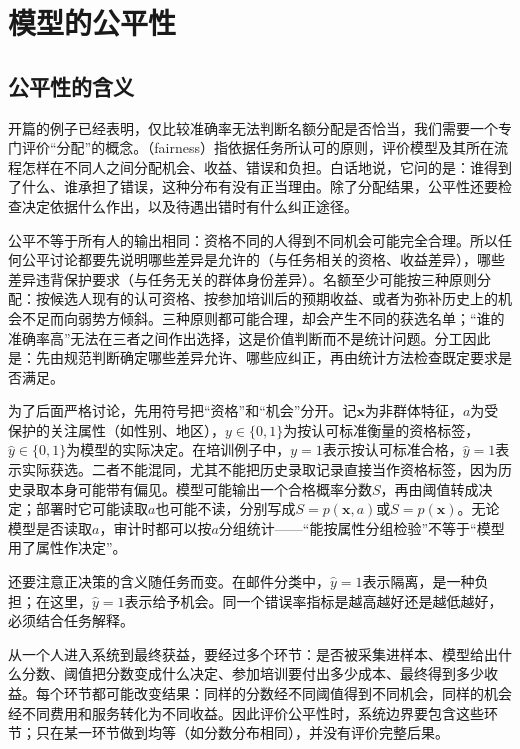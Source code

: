 \section{模型的公平性}
\label{sec:fairness-concepts}

\subsection{公平性的含义}
\label{sec:fairness-meaning}

开篇的例子已经表明，仅比较准确率无法判断名额分配是否恰当，我们需要一个专门评价“分配”的概念。（fairness）指依据任务所认可的原则，评价模型及其所在流程怎样在不同人之间分配机会、收益、错误和负担。白话地说，它问的是：谁得到了什么、谁承担了错误，这种分布有没有正当理由。除了分配结果，公平性还要检查决定依据什么作出，以及待遇出错时有什么纠正途径。

公平不等于所有人的输出相同：资格不同的人得到不同机会可能完全合理。所以任何公平讨论都要先说明哪些差异是允许的（与任务相关的资格、收益差异），哪些差异违背保护要求（与任务无关的群体身份差异）。名额至少可能按三种原则分配：按候选人现有的认可资格、按参加培训后的预期收益、或者为弥补历史上的机会不足而向弱势方倾斜。三种原则都可能合理，却会产生不同的获选名单；“谁的准确率高”无法在三者之间作出选择，这是价值判断而不是统计问题。分工因此是：先由规范判断确定哪些差异允许、哪些应纠正，再由统计方法检查既定要求是否满足。

为了后面严格讨论，先用符号把“资格”和“机会”分开。记$\bm{x}$为非群体特征，$a$为受保护的关注属性（如性别、地区），$y\in\{0,1\}$为按认可标准衡量的资格标签，$\hat y\in\{0,1\}$为模型的实际决定。在培训例子中，$y=1$表示按认可标准合格，$\hat y=1$表示实际获选。二者不能混同，尤其不能把历史录取记录直接当作资格标签，因为历史录取本身可能带有偏见。模型可能输出一个合格概率分数$S$，再由阈值转成决定；部署时它可能读取$a$也可能不读，分别写成$S=p(\bm{x},a)$或$S=p(\bm{x})$。无论模型是否读取$a$，审计时都可以按$a$分组统计——“能按属性分组检验”不等于“模型用了属性作决定”。

还要注意正决策的含义随任务而变。在邮件分类中，$\hat y=1$表示隔离，是一种负担；在这里，$\hat y=1$表示给予机会。同一个错误率指标是越高越好还是越低越好，必须结合任务解释。

从一个人进入系统到最终获益，要经过多个环节：是否被采集进样本、模型给出什么分数、阈值把分数变成什么决定、参加培训要付出多少成本、最终得到多少收益。每个环节都可能改变结果：同样的分数经不同阈值得到不同机会，同样的机会经不同费用和服务转化为不同收益。因此评价公平性时，系统边界要包含这些环节；只在某一环节做到均等（如分数分布相同），并没有评价完整后果。

